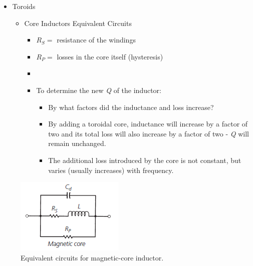 \begin{itemize}
	\item Toroids
	\begin{itemize}
		\item Core Inductors Equivalent Circuits
		\begin{itemize}
			\item $R_S =$ resistance of the windings
			\item $R_P =$ losses in the core itself (hysteresis)
			\item[]
			\item To determine the new \textit{Q} of the inductor:
			\begin{itemize}
				\item[] By what factors did the inductance and loss increase?
				\item By adding a toroidal core, inductance will increase
				by a factor of two and its total loss will also increase by a factor	of two - \textit{Q} will remain unchanged.
				\item The additional loss introduced by the core is not constant, but varies (usually increases) with frequency.
			\end{itemize}
		\end{itemize}
	\end{itemize}
\end{itemize}

\begin{figure} [H]
	\centering
	\includegraphics[width=0.4\linewidth]{graphics/20.png}
	\caption{Equivalent circuits for magnetic-core inductor.}
	\label{fig:20}
\end{figure}

